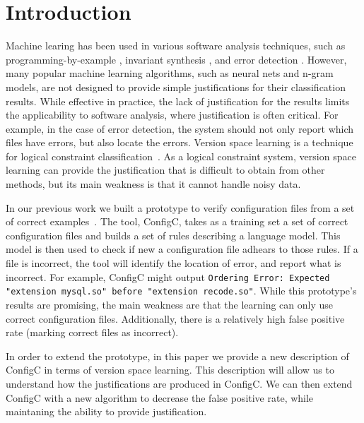 \section{Introduction}

Machine learing has been used in various software analysis techniques, such as programming-by-example \cite{lau2000version}, invariant synthesis \cite{garg2014ice}, and error detection \cite{Santolucito2016}.
However, many popular machine learning algorithms, such as neural nets and n-gram models, are not designed to provide simple justifications for their classification results.
While effective in practice, the lack of justification for the results limits the applicability to software analysis, where justification is often critical.
For example, in the case of error detection, the system should not only report which files have errors, but also locate the errors.
Version space learning is a technique for logical constraint classification~\cite{mitchell82}.
As a logical constraint system, version space learning can provide the justification that is difficult to obtain from other methods, but its main weakness is that it cannot handle noisy data.


In our previous work we built a prototype to verify configuration files from a set of correct examples~\cite{Santolucito2016}.
The tool, ConfigC, takes as a training set a set of correct configuration files and builds a set of rules describing a language model.
This model is then used to check if new a configuration file adhears to those rules.
If a file is incorrect, the tool will identify the location of error, and report what is incorrect.
For example, ConfigC might output \texttt{Ordering Error: Expected "extension mysql.so" before "extension recode.so"}.
While this prototype's results are promising, the main weakness are that the learning can only use correct configuration files.
Additionally, there is a relatively high false positive rate (marking correct files as incorrect).

In order to extend the prototype, in this paper we provide a new description of ConfigC in terms of version space learning.
This description will allow us to understand how the justifications are produced in ConfigC.
We can then extend ConfigC with a new algorithm to decrease the false positive rate, while maintaning the ability to provide justification.

